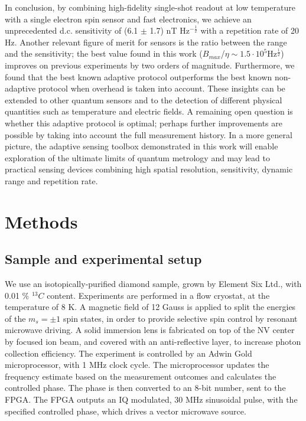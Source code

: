 In conclusion, by combining high-fidelity single-shot readout at low temperature with a single electron spin sensor and fast electronics, we achieve an unprecedented d.c. sensitivity of (6.1 $\pm$ 1.7) nT Hz$^{-\frac{1}{2}}$ with a repetition rate of 20 Hz. Another relevant figure of merit for sensors is the ratio between the range and the sensitivity; the best value found in this work ($B_{max}$/$\eta \sim 1.5 \cdot 10^5 $Hz$^{\frac{1}{2}}$) improves on previous experiments by two orders of magnitude\cite{Waldherr_NatNano_2012,Nusran_NatNano_2012}. Furthermore, we found that the best known adaptive protocol outperforms the best known non-adaptive protocol when overhead is taken into account. These insights can be extended to other quantum sensors and to the detection of different physical quantities such as temperature and electric fields. A remaining open question is whether this adaptive protocol is optimal; perhaps further improvements are possible by taking into account the full measurement history. In a more general picture, the adaptive sensing toolbox demonstrated in this work will enable exploration of the ultimate limits of quantum metrology and may lead to practical sensing devices combining high spatial resolution, sensitivity, dynamic range and repetition rate.



\section{Methods}
\subsection{Sample and experimental setup}
We use an isotopically-purified diamond sample, grown by Element Six Ltd., with 0.01 \% $^{13}C$ content. Experiments are performed in a flow cryostat, at the temperature of 8 K. A magnetic field of 12 Gauss is applied to split the energies of the $m_s = \pm 1$ spin states, in order to provide selective spin control by resonant microwave driving. A solid immersion lens is fabricated on top of the NV center by focused ion beam, and covered with an anti-reflective layer, to increase photon collection efficiency.  
The experiment is controlled by an Adwin Gold microprocessor, with 1 MHz clock cycle. The microprocessor updates the frequency estimate based on the measurement outcomes and calculates the controlled phase. The phase is then converted to an 8-bit number, sent to the FPGA. The FPGA outputs an IQ modulated, 30 MHz sinusoidal pulse, with the specified controlled phase, which drives a vector microwave source.

